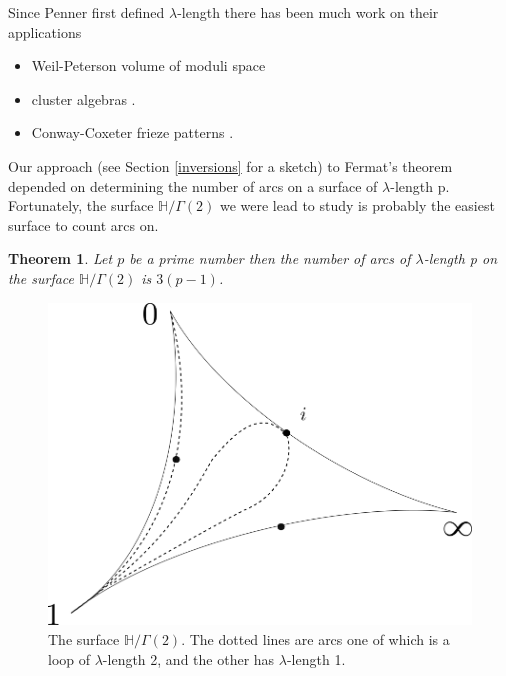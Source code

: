 \documentclass[12pt,a4paper]{amsart}
\newtheorem{thm}{Theorem}[section]
\def\HH{\mathbb{H}}
\def\g2{\Gamma(2)}
\def\xx{\HH/\g2}
\begin{document}
Since Penner \cite{bob} first defined $\lambda$-length 
there has been much work on their applications

\begin{itemize}
	\item Weil-Peterson volume of moduli space \cite{bob}
	\item cluster algebras \cite{fomin}.
	\item Conway-Coxeter frieze patterns \cite{frieze}.
\end{itemize}
Our approach (see Section \ref{inversions} for a sketch) to Fermat's theorem \cite{vlad} depended on determining the number of arcs on a surface
of $\lambda$-length p.
Fortunately, the surface $\xx$ we were lead to study is  probably
the easiest surface to count arcs on.

\begin{thm}\label{g2 arcs}
	Let $p$ be a prime number then the number of arcs of
	$\lambda$-length p on the surface
	$\xx$ is $3(p-1)$.
\end{thm}



 \begin{figure}[ht]
\begin{center}
\includegraphics[scale=.3]{3sphere.png} 
\end{center}
\caption{The surface $\xx$. The dotted lines are arcs one of which
is a loop of $\lambda$-length 2, and the other has $\lambda$-length 1.}
\label{3sphere}
\end{figure}
\end{document}
